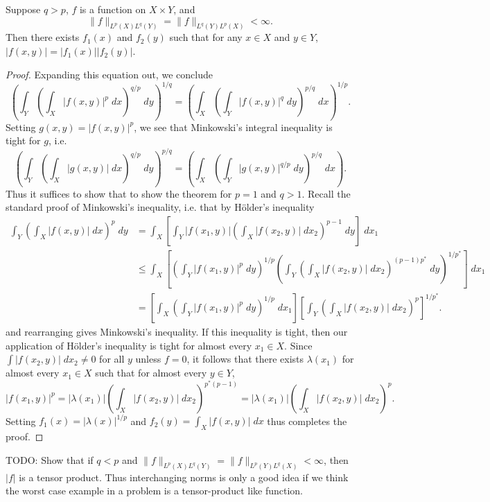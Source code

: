\begin{theorem}
  Suppose $q > p$, $f$ is a function on $X \times Y$, and
  \[ \| f \|_{L^p(X) L^q(Y)} = \| f \|_{L^q(Y) L^p(X)} < \infty. \]
  Then there exists $f_1(x)$ and $f_2(y)$ such that for any $x \in X$ and $y \in Y$, $|f(x,y)| = |f_1(x)| |f_2(y)|$.
\end{theorem}
\begin{proof}
  Expanding this equation out, we conclude
  \[ \left( \int_Y \left( \int_X |f(x,y)|^p\; dx \right)^{q/p}\; dy \right)^{1/q} = \left( \int_X \left( \int_Y |f(x,y)|^q\; dy \right)^{p/q}\; dx \right)^{1/p}. \]
  Setting $g(x,y) = |f(x,y)|^p$, we see that Minkowski's integral inequality is tight for $g$, i.e.
  \[ \left( \int_Y \left( \int_X |g(x,y)|\; dx \right)^{q/p}\; dy \right)^{p/q} = \left( \int_X \left( \int_Y |g(x,y)|^{q/p}\; dy \right)^{p/q}\; dx \right). \]
  Thus it suffices to show that to show the theorem for $p = 1$ and $q > 1$. Recall the standard proof of Minkowski's inequality, i.e. that by H\"{o}lder's inequality
  \begin{align*}
    \int_Y \left( \int_X |f(x,y)|\; dx \right)^p\; dy &= \int_X \left[ \int_Y |f(x_1,y)| \left( \int_X |f(x_2,y)|\; dx_2 \right)^{p-1}\; dy \right]\; dx_1\\
    &\leq \int_X \left[ \left( \int_Y |f(x_1,y)|^p\; dy \right)^{1/p} \left( \int_Y \left( \int_X |f(x_2,y)|\; dx_2 \right)^{(p-1)p^*}\; dy \right)^{1/p^*} \right]\; dx_1 \\
    &= \left[ \int_X \left( \int_Y |f(x_1,y)|^p\; dy \right)^{1/p}\; dx_1 \right] \left[ \int_Y \left( \int_X |f(x_2,y)|\; dx_2 \right)^p \right]^{1/p^*}.
  \end{align*}
  and rearranging gives Minkowski's inequality. If this inequality is tight, then our application of H\"{o}lder's inequality is tight for almost every $x_1 \in X$. Since $\int |f(x_2,y)|\; dx_2 \neq 0$ for all $y$ unless $f = 0$, it follows that there exists $\lambda(x_1)$ for almost every $x_1 \in X$ such that for almost every $y \in Y$,
  \[ |f(x_1,y)|^p = |\lambda(x_1)| \left( \int_X |f(x_2,y)|\; dx_2 \right)^{p^*(p-1)} = |\lambda(x_1)| \left( \int_X |f(x_2,y)|\; dx_2 \right)^p. \]
  Setting $f_1(x) = |\lambda(x)|^{1/p}$ and $f_2(y) = \int_X |f(x,y)|\; dx$ thus completes the proof.
\end{proof}

TODO: Show that if $q < p$ and $\| f \|_{L^p(X) L^q(Y)} = \| f \|_{L^p(Y) L^q(X)} < \infty$, then $|f|$ is a tensor product. Thus interchanging norms is only a good idea if we think the worst case example in a problem is a tensor-product like function.

